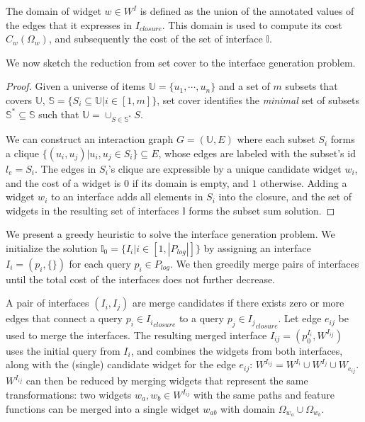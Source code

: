 The domain of widget $w \in W^I$ is defined as the union of the annotated values of the edges that it expresses in $I_{closure}$.   This domain is used to compute its cost $C_w(\Omega_w)$, and subsequently the cost of the set of interface $\mathbb{I}$.


 We now sketch the reduction from set cover to the interface generation problem.
\begin{proof}
Given a universe of items $\mathbb{U} = \{u_1,\cdots,u_n\}$ and a set of $m$ subsets that covers $\mathbb{U}$, $\mathbb{S} = \{ S_i \subseteq \mathbb{U} | i \in [1, m]\}$, set cover identifies the {\it minimal} set of subsets $\mathbb{S}^* \subseteq \mathbb{S}$ such that $\mathbb{U} = \cup_{S \in \mathbb{S}^*} S$.

We can construct an interaction graph $G = (\mathbb{U}, E)$ where each subset $S_i$ forms a clique $\{ (u_i, u_j) | u_i, u_j \in S_i \} \subseteq E$, whose edges are labeled with the subset's id $l_e = S_i$.  The edges in $S_i$'s clique are expressible by a unique candidate widget $w_i$, and the cost of a widget is $0$ if its domain is empty, and $1$ otherwise.  Adding a widget $w_i$ to an interface adds all elements in $S_i$ into the closure, and the set of widgets in the resulting set of interfaces $\mathbb{I}$ forms the subset sum solution.
\end{proof}




  We present a greedy heuristic to solve the interface generation problem.  We initialize the solution $\mathbb{I}_0 = \{ I_i | i \in [1, |P_{log}|]\}$ by assigning an interface $I_i = (p_i, \{\})$ for each query $p_i \in P_{log}$.  We then greedily merge pairs of interfaces until the total cost of the interfaces does not further decrease.

A pair of interfaces $(I_i, I_j)$ are merge candidates if there exists zero or more edges that connect a query $p_i \in {I_i}_{closure}$ to a query $p_j \in {I_j}_{closure}$.  Let edge $e_{ij}$ be used to merge the interfaces.   The resulting merged interface $I_{ij} = (p^{I_i}_0, W^{I_{ij}})$ uses the initial query from $I_i$, and combines the widgets from both interfaces, along with the (single) candidate widget for the edge $e_{ij}$: $W^{I_{ij}} = W^{I_i} \cup W^{I_j} \cup W_{e_{ij}}$.   $W^{I_{ij}}$ can then be reduced by merging widgets that represent the same transformations: two widgets $w_a,w_b \in W^{I_{ij}}$ with the same paths and feature functions can be merged into a single widget $w_{ab}$ with domain $\Omega_{w_a} \cup \Omega_{w_b}$.


